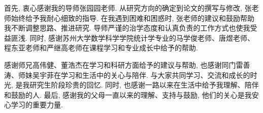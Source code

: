\documentclass[a4paper,openay,14pt]{ctexbook}
\numberwithin{equation}{section}
\numberwithin{lem}{section}
\newcommand{\RootPrefix}{}
\begin{document}
首先,  衷心感谢我的导师张园园老师. 从研究方向的确定到论文的撰写与修改,  张老师始终给予我耐心细致的指导. 在我遇到困难和困惑时,  张老师的建议和鼓励帮助我不断调整思路、推进研究. 导师严谨的治学态度和认真负责的工作方式也使我受益匪浅. 同时,  感谢苏州大学数学科学学院统计学专业的马学俊老师、唐煜老师、程东亚老师和严继高老师在课程学习和专业成长中给予的帮助.

感谢师兄高伟健、董浩杰在学习和科研方面给予的建议与帮助,  也感谢同门雷善涛、师妹吴宇菲在学习和生活中的关心与陪伴. 与大家共同学习、交流和成长的时光,  是我研究生阶段珍贵的回忆. 同时,  也感谢一路以来在生活中给予我理解、陪伴和鼓励的人. 最后,  感谢我的父母一直以来的理解、支持与鼓励,  他们的关心是我安心学习的重要力量.

\end{document}
